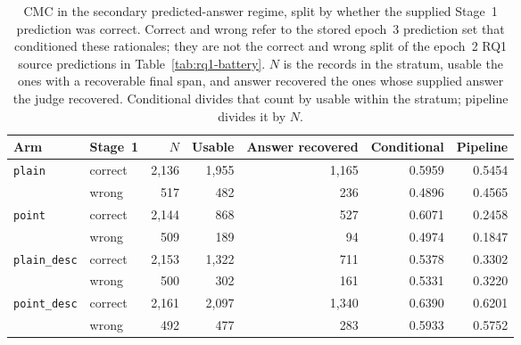 \begin{table}[ht]
\centering
\caption[Predicted-answer CMC by Stage~1 correctness]{CMC in the secondary
predicted-answer regime, split by whether the supplied Stage~1 prediction was
correct. Correct and wrong refer to the stored epoch~3 prediction set that
conditioned these rationales; they are not the correct and wrong split of the
epoch~2 RQ1 source predictions in Table~\ref{tab:rq1-battery}. $N$ is the
records in the stratum, usable the ones with a recoverable final span, and
answer recovered the ones whose supplied answer the judge recovered. Conditional
divides that count by usable within the stratum; pipeline divides it by $N$.}
\label{tab:app-pred-a-strata}
\begin{tabular}{llrrrrr}
\toprule
Arm & Stage~1 & $N$ & Usable & Answer recovered & Conditional & Pipeline \\
\midrule
\texttt{plain} & correct & 2,136 & 1,955 & 1,165 & 0.5959 & 0.5454 \\
 & wrong & 517 & 482 & 236 & 0.4896 & 0.4565 \\
\addlinespace
\texttt{point} & correct & 2,144 & 868 & 527 & 0.6071 & 0.2458 \\
 & wrong & 509 & 189 & 94 & 0.4974 & 0.1847 \\
\addlinespace
\texttt{plain\_desc} & correct & 2,153 & 1,322 & 711 & 0.5378 & 0.3302 \\
 & wrong & 500 & 302 & 161 & 0.5331 & 0.3220 \\
\addlinespace
\texttt{point\_desc} & correct & 2,161 & 2,097 & 1,340 & 0.6390 & 0.6201 \\
 & wrong & 492 & 477 & 283 & 0.5933 & 0.5752 \\
\bottomrule
\end{tabular}
\end{table}

